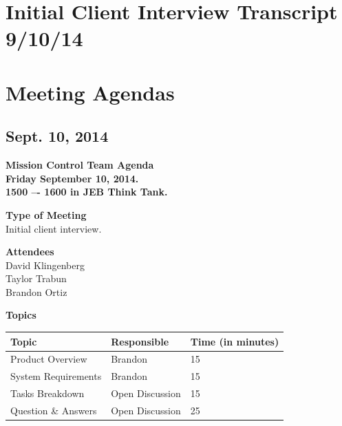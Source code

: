 \documentclass[pdftex,11pt]{article}
\begin{document}
\clearpage
\section{Initial Client Interview Transcript 9/10/14}
\label{sec:clienttranscript}

\clearpage


\section{Meeting Agendas}

\subsection{Sept. 10, 2014}
{ \huge \bfseries Mission Control Team Agenda \\[0.4cm] }
{ \huge \bfseries Friday September  10, 2014.\\1500 –-  1600  in JEB   Think  Tank. \\[0.4cm] }
\vspace*{2.5mm}

{ \large \bfseries \hspace*{2 mm} Type of Meeting\\}
\hspace*{12 mm} Initial client interview.
\vspace*{1.5mm}

{ \large \bfseries \hspace*{2 mm} Attendees\\}
\hspace*{12mm} David Klingenberg\\
\hspace*{12mm} Taylor Trabun\\
\hspace*{12mm} Brandon Ortiz\\
\vspace*{1.5mm}

{ \large \bfseries \noindent Topics}
\vspace*{2.5mm}

\begin{tabular}{| l | l | l |}
  \hline
  \bfseries Topic & \bfseries Responsible & \bfseries Time (in minutes) \\ \hline
  Product  Overview  &  Brandon &  15 \\ \hline
  System  Requirements & Brandon & 15 \\ \hline
  Tasks Breakdown & Open Discussion & 15 \\ \hline
  Question \&  Answers  & Open Discussion & 25 \\ 
  \hline
\end{tabular}
\end{document}
